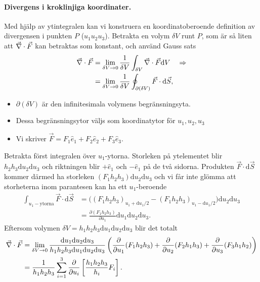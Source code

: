 \documentclass[%
oneside,                 %
final,                   %
10pt]{article}
\begin{document}
\paragraph{Divergens i kroklinjiga koordinater.}
Med hjälp av ytintegralen kan vi konstruera en koordinatoberoende definition av divergensen i punkten $P$ ($u_1u_2u_3$). Betrakta en volym $\delta V$ runt $P$, som är så liten att $\vec{\nabla} \cdot \vec{F}$ kan betraktas som konstant, och använd Gauss sats
\begin{align}
  \vec{\nabla} \cdot \vec{F} &=\lim_{\delta V \to 0} \frac{1}{\delta V} \int_{\delta V} \vec{\nabla} \cdot \vec{F} \mbox{d} V \quad \Rightarrow \nonumber \\
  &= \lim_{\delta V \to 0} \frac{1}{\delta V} \oint_{\partial (\delta
V)} \vec{F} \cdot \mbox{d}\vec{S},
\end{align}
\begin{itemize}
\item $\partial (\delta V)$ är den infinitesimala volymens begränsningsyta. 

\item Dessa  begränsningsytor väljs som koordinatytor för $u_1,u_2,u_3$ 

\item Vi skriver $\vec{F} = F_1 \hat{e}_1 + F_2 \hat{e}_2 + F_3 \hat{e}_3$. 
\end{itemize}

\noindent
Betrakta först integralen över $u_1$-ytorna. Storleken på ytelementet blir $h_2 h_3 \mbox{d}u_2 \mbox{d}u_3$ och riktningen blir $+\hat{e}_1$ och $-\hat{e}_1$ på de två sidorna. Produkten $\vec{F} \cdot \mbox{d} \vec{S}$ kommer därmed ha storleken $(F_1 h_2 h_3) \mbox{d}u_2 \mbox{d}u_3$ och vi får inte glömma att storheterna inom parantesen kan ha ett $u_1$-beroende
\begin{align}
\int_{u_1-\mathrm{ytorna}} \vec{F} \cdot \mbox{d} \vec{S} &= \Big( (F_1 h_2 h_3)_{u_1 + \mathrm{d} u_1/2} - (F_1 h_2 h_3)_{u_1-\mathrm{d} u_1/2} \Big)  \mbox{d}u_2 \mbox{d}u_3 \nonumber \\
&= \frac{\partial (F_1 h_2 h_3)}{\partial u_1} \mbox{d}u_1 \mbox{d}u_2 \mbox{d}u_3.
\end{align}
Eftersom volymen $\delta V = h_1 h_2 h_3 \mbox{d}u_1 \mbox{d}u_2 \mbox{d}u_3$ blir det totalt
\begin{align}
\vec{\nabla} \cdot \vec{F} &= \lim_{\delta V \to 0}  \frac{\mbox{d}u_1 \mbox{d}u_2 \mbox{d}u_3}{h_1 h_2 h_3 \mbox{d}u_1 \mbox{d}u_2 \mbox{d}u_3} \left( \frac{\partial}{\partial u_1} (F_1 h_2 h_3) + \frac{\partial}{\partial u_2} (F_2 h_1 h_3) + \frac{\partial}{\partial u_3} (F_3 h_1 h_2) \right) \nonumber \\
&= \frac{1}{h_1 h_2 h_3} \sum_{i=1}^3 \frac{\partial}{\partial u_i} \left[ \frac{h_1 h_2 h_3}{h_i} F_i \right].
\end{align}
\end{document}

